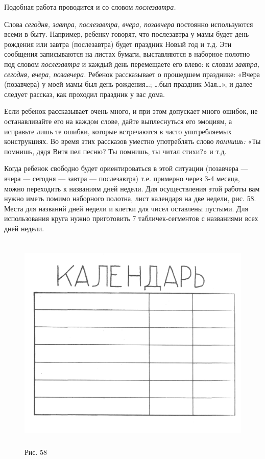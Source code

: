 \documentclass{book}
\renewcommand{\emph}[1]{\textit{#1}}
\begin{document}
Подобная работа проводится и со словом \emph{послезавтра.}

Слова \emph{сегодня, завтра, послезавтра, вчера, позавчера} постоянно
используются всеми в быту. Например, ребенку говорят, что послезавтра у
мамы будет день рождения или завтра (послезавтра) будет праздник Новый
год и т.д. Эти сообщения записываются на листах бумаги, выставляются в
наборное полотно под словом \emph{послезавтра} и каждый день перемещаете
его влево: к словам \emph{завтра, сегодня, вчера, позавчера.} Ребенок
рассказывает о прошедшем празднике: «Вчера (позавчера) у моей мамы был
день рождения\ldots; \ldots был праздник Мая\ldots», и далее следует
рассказ, как проходил праздник у вас дома.

Если ребенок рассказывает очень много, и при этом допускает много
ошибок, не останавливайте его на каждом слове, дайте выплеснуться его
эмоциям, а исправьте лишь те ошибки, которые встречаются в часто
употребляемых конструкциях. Во время этих рассказов уместно употреблять
слово \emph{помнишь:} «Ты помнишь, дядя Витя пел песню? Ты помнишь, ты
читал стихи?» и т.д.

Когда ребенок свободно будет ориентироваться в этой ситуации (позавчера
--- вчера --- сегодня --- завтра --- послезавтра) т.е. примерно через
3-4 месяца, можно переходить к названиям дней недели. Для осуществления
этой работы вам нужно иметь помимо наборного полотна, лист календаря на
две недели, рис. 58. Места для названий дней недели и клетки для чисел
оставлены пустыми. Для использования круга нужно приготовить 7
табличек-сегментов с названиями всех дней недели.

\begin{figure}
\centering
\includegraphics[width=5.01319in,height=4.16667in]{media/media/image55.jpg}
\caption*{Рис. 58}
\end{figure}
\end{document}
